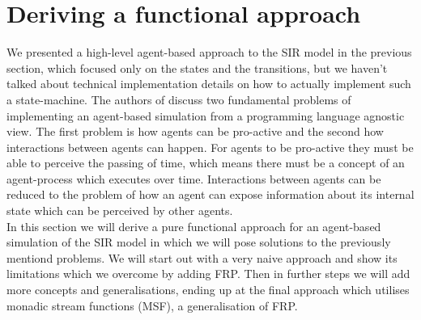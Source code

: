 \section{Deriving a functional approach}

We presented a high-level agent-based approach to the SIR model in the previous section, which focused only on the states and the transitions, but we haven't talked about technical implementation details on how to actually implement such a state-machine. The authors of \cite{thaler_art_2017} discuss two fundamental problems of implementing an agent-based simulation from a programming language agnostic view. The first problem is how agents can be pro-active and the second how interactions between agents can happen. For agents to be pro-active they must be able to perceive the passing of time, which means there must be a concept of an agent-process which executes over time. Interactions between agents can be reduced to the problem of how an agent can expose information about its internal state which can be perceived by other agents. \\
In this section we will derive a pure functional approach for an agent-based simulation of the SIR model in which we will pose solutions to the previously mentiond problems. We will start out with a very naive approach and show its limitations which we overcome by adding FRP. Then in further steps we will add more concepts and generalisations, ending up at the final approach which utilises monadic stream functions (MSF), a generalisation of FRP.











%